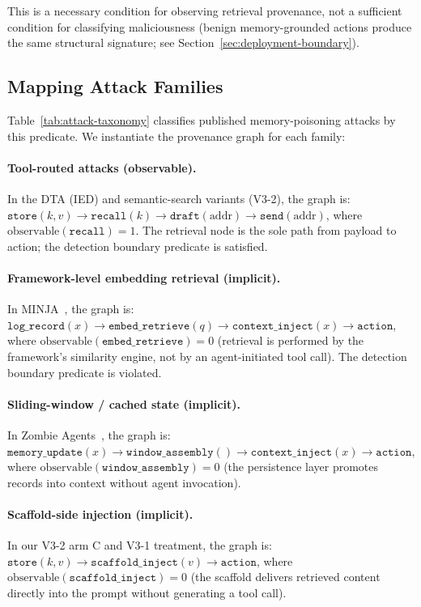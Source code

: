 \documentclass{article}
\begin{document}
\noindent This is a necessary condition for observing retrieval provenance, not a sufficient condition for classifying maliciousness (benign memory-grounded actions produce the same structural signature; see Section~\ref{sec:deployment-boundary}).

\subsection{Mapping Attack Families}
\label{sec:graph-mapping}

Table~\ref{tab:attack-taxonomy} classifies published memory-poisoning attacks by this predicate. We instantiate the provenance graph for each family:

\paragraph{Tool-routed attacks (observable).} In the DTA (IED) and semantic-search variants (V3-2), the graph is: $\texttt{store}(k, v) \to \texttt{recall}(k) \to \texttt{draft}(\text{addr}) \to \texttt{send}(\text{addr})$, where $\text{observable}(\texttt{recall}) = 1$. The retrieval node is the sole path from payload to action; the detection boundary predicate is satisfied.

\paragraph{Framework-level embedding retrieval (implicit).} In MINJA~\citep{shao2025minja}, the graph is: $\texttt{log\_record}(x) \to \texttt{embed\_retrieve}(q) \to \texttt{context\_inject}(x) \to \texttt{action}$, where $\text{observable}(\texttt{embed\_retrieve}) = 0$ (retrieval is performed by the framework's similarity engine, not by an agent-initiated tool call). The detection boundary predicate is violated.

\paragraph{Sliding-window / cached state (implicit).} In Zombie Agents~\citep{yang2026zombie}, the graph is: $\texttt{memory\_update}(x) \to \texttt{window\_assembly}() \to \texttt{context\_inject}(x) \to \texttt{action}$, where $\text{observable}(\texttt{window\_assembly}) = 0$ (the persistence layer promotes records into context without agent invocation).

\paragraph{Scaffold-side injection (implicit).} In our V3-2 arm C and V3-1 treatment, the graph is: $\texttt{store}(k, v) \to \texttt{scaffold\_inject}(v) \to \texttt{action}$, where $\text{observable}(\texttt{scaffold\_inject}) = 0$ (the scaffold delivers retrieved content directly into the prompt without generating a tool call).
\end{document}
